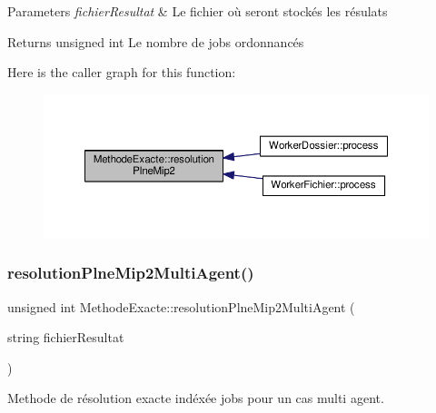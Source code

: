 \begin{DoxyParams}{Parameters}
{\em fichier\+Resultat} & Le fichier où seront stockés les résulats \\
\hline
\end{DoxyParams}
\begin{DoxyReturn}{Returns}
unsigned int Le nombre de jobs ordonnancés 
\end{DoxyReturn}
Here is the caller graph for this function\+:\nopagebreak
\begin{figure}[H]
\begin{center}
\leavevmode
\includegraphics[width=350pt]{classMethodeExacte_a3163e487cc9e99ee7667d1dd146edb4b_icgraph}
\end{center}
\end{figure}
\mbox{\label{classMethodeExacte_af5ed64d8d21ead081e02c3ac97192859}} 
\subsubsection{\texorpdfstring{resolution\+Plne\+Mip2\+Multi\+Agent()}{resolutionPlneMip2MultiAgent()}}
{\footnotesize\ttfamily unsigned int Methode\+Exacte\+::resolution\+Plne\+Mip2\+Multi\+Agent (\begin{DoxyParamCaption}\item[{string}]{fichier\+Resultat }\end{DoxyParamCaption})}



Methode de résolution exacte indéxée jobs pour un cas multi agent. 


